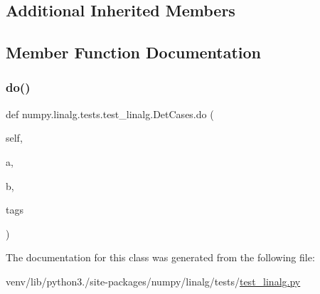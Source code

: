 \subsection*{Additional Inherited Members}


\subsection{Member Function Documentation}
\mbox{\label{classnumpy_1_1linalg_1_1tests_1_1test__linalg_1_1DetCases_a2fc3bc762f2ec5f23df07c587d027f3d}} 
\subsubsection{\texorpdfstring{do()}{do()}}
{\footnotesize\ttfamily def numpy.\+linalg.\+tests.\+test\+\_\+linalg.\+Det\+Cases.\+do (\begin{DoxyParamCaption}\item[{}]{self,  }\item[{}]{a,  }\item[{}]{b,  }\item[{}]{tags }\end{DoxyParamCaption})}



The documentation for this class was generated from the following file\+:\begin{DoxyCompactItemize}
\item 
venv/lib/python3./site-\/packages/numpy/linalg/tests/\hyperlink{test__linalg_8py}{test\+\_\+linalg.\+py}\end{DoxyCompactItemize}
